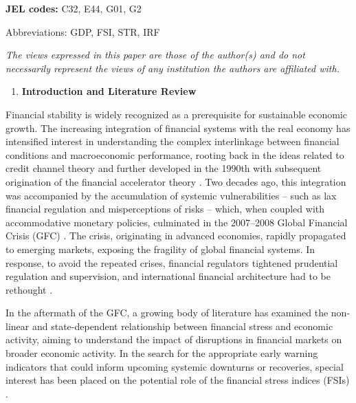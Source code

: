 \documentclass[12pt,preprint,aps,author-year]{revtex4-1}
\begin{document}
\textbf{JEL codes:} C32, E44, G01, G2

Abbreviations: GDP, FSI, STR, IRF

\textit{The views expressed in this paper are those of the author(s) and do not necessarily represent the views of any institution the authors are affiliated with.}

\newpage

\begin{enumerate}
\item \textbf{Introduction and Literature Review}
\end{enumerate}
Financial stability is widely recognized as a prerequisite for sustainable economic growth. The increasing integration of financial systems with the real economy has intensified interest in understanding the complex interlinkage between financial conditions and macroeconomic performance, rooting back in the ideas related to credit channel theory \citep{bernanke1983} and further developed in the 1990th with subsequent origination of the financial accelerator theory \citep{bernankegertlergilchrist1999}. Two decades ago, this integration was accompanied by the accumulation of systemic vulnerabilities – such as lax financial regulation and misperceptions of risks – which, when coupled with accommodative monetary policies, culminated in the 2007–2008 Global Financial Crisis (GFC) \citep{verickislam2010}. The crisis, originating in advanced economies, rapidly propagated to emerging markets, exposing the fragility of global financial systems. In response, to avoid the repeated crises, financial regulators tightened prudential regulation and supervision, and international financial architecture had to be rethought \citep{claessens2010}.

In the aftermath of the GFC, a growing body of literature has examined the non-linear and state-dependent relationship between financial stress and economic activity, aiming to understand the impact of disruptions in financial markets on broader economic activity. In the search for the appropriate early warning indicators that could inform upcoming systemic downturns or recoveries, special interest has been placed on the potential role of the financial stress indices (FSIs) \citep{cardarelli2011, vasicek2017}.
\end{document}
